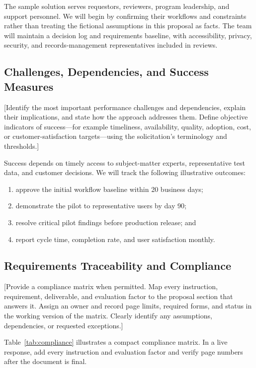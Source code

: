 The sample solution serves requestors, reviewers, program leadership, and
support personnel. We will begin by confirming their workflows and constraints
rather than treating the fictional assumptions in this proposal as facts. The
team will maintain a decision log and requirements baseline, with accessibility,
privacy, security, and records-management representatives included in reviews.

\subsection{Challenges, Dependencies, and Success Measures}
[Identify the most important performance challenges and dependencies, explain
their implications, and state how the approach addresses them. Define
objective indicators of success---for example timeliness, availability,
quality, adoption, cost, or customer-satisfaction targets---using the
solicitation's terminology and thresholds.]

Success depends on timely access to subject-matter experts, representative test
data, and customer decisions. We will track the following illustrative outcomes:
\begin{enumerate}
    \item approve the initial workflow baseline within 20 business days;
    \item demonstrate the pilot to representative users by day 90;
    \item resolve critical pilot findings before production release; and
    \item report cycle time, completion rate, and user satisfaction monthly.
\end{enumerate}

\subsection{Requirements Traceability and Compliance}
[Provide a compliance matrix when permitted. Map every instruction,
requirement, deliverable, and evaluation factor to the proposal section that
answers it. Assign an owner and record page limits, required forms, and status
in the working version of the matrix. Clearly identify any assumptions,
dependencies, or requested exceptions.]

Table~\ref{tab:compliance} illustrates a compact compliance matrix. In a live
response, add every instruction and evaluation factor and verify page numbers
after the document is final.


